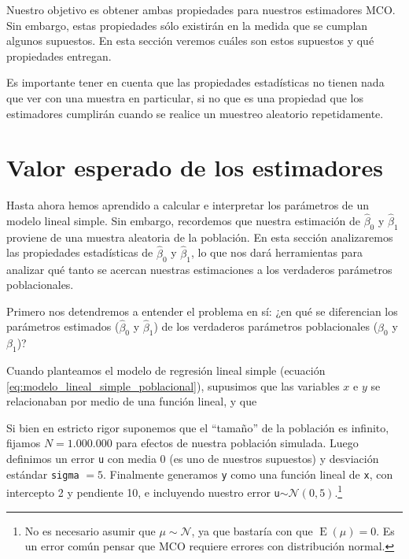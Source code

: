 \documentclass{report}\usepackage[]{graphicx}\usepackage[]{color}
\newcommand{\E}{\operatorname{E}}
\begin{document}
Nuestro objetivo es obtener ambas propiedades para nuestros estimadores MCO.
Sin embargo, estas propiedades sólo existirán en la medida que se cumplan algunos supuestos. En esta sección veremos cuáles son estos supuestos y qué propiedades entregan.

Es importante tener en cuenta que las propiedades estadísticas no tienen nada que ver con una muestra en particular, si no que es una propiedad que los estimadores cumplirán cuando se realice un muestreo aleatorio repetidamente.



\hrulefill

\section{Valor esperado de los estimadores}

Hasta ahora hemos aprendido a calcular e interpretar los parámetros de un modelo lineal simple. Sin embargo, recordemos que nuestra estimación de $\hat\beta_0$ y $\hat\beta_1$ proviene de una muestra aleatoria de la población.
En esta sección analizaremos las propiedades estadísticas de $\hat\beta_0$ y $\hat\beta_1$, lo que nos dará herramientas para analizar qué tanto se acercan nuestras estimaciones a los verdaderos parámetros poblacionales.

Primero nos detendremos a entender el problema en sí: ¿en qué se diferencian los parámetros estimados ($\hat\beta_0$ y $\hat\beta_1$) de los verdaderos parámetros poblacionales ($\beta_0$ y $\beta_1$)?

Cuando planteamos el modelo de regresión lineal simple (ecuación \eqref{eq:modelo_lineal_simple_poblacional}), supusimos que las variables $x$ e $y$ se relacionaban por medio de una función lineal, y que 

Si bien en estricto rigor suponemos que el ``tamaño'' de la población es infinito, fijamos $N=1.000.000$ para efectos de nuestra población simulada.
Luego definimos un error \verb|u| con media 0 (es uno de nuestros supuestos) y desviación estándar \verb|sigma| $=5$. Finalmente generamos \verb|y| como una función lineal de \verb|x|, con intercepto 2 y pendiente 10, e incluyendo nuestro error \verb|u|$\sim \mathcal{N}(0, 5)$.\footnote{No es necesario asumir que $\mu \sim \mathcal{N}$, ya que bastaría con que $\E(\mu)=0$. Es un error común pensar que MCO requiere errores con distribución normal.}
\end{document}
